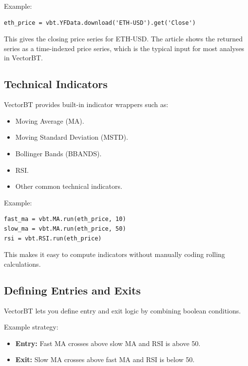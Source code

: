 \documentclass[12pt,openany]{book}
\begin{document}
Example:

\begin{Verbatim}[breaklines=true,breakanywhere=true,fontsize=\small]
eth_price = vbt.YFData.download('ETH-USD').get('Close')
\end{Verbatim}

This gives the closing price series for ETH-USD. The article shows the returned series as a time-indexed price series, which is the typical input for most analyses in VectorBT.

\subsection{Technical Indicators}

VectorBT provides built-in indicator wrappers such as:

\begin{itemize}[leftmargin=*]
    \item Moving Average (MA).
    \item Moving Standard Deviation (MSTD).
    \item Bollinger Bands (BBANDS).
    \item RSI.
    \item Other common technical indicators.
\end{itemize}

Example:

\begin{Verbatim}[breaklines=true,breakanywhere=true,fontsize=\small]
fast_ma = vbt.MA.run(eth_price, 10)
slow_ma = vbt.MA.run(eth_price, 50)
rsi = vbt.RSI.run(eth_price)
\end{Verbatim}

This makes it easy to compute indicators without manually coding rolling calculations.

\subsection{Defining Entries and Exits}

VectorBT lets you define entry and exit logic by combining boolean conditions.

Example strategy:

\begin{itemize}[leftmargin=*]
    \item \textbf{Entry:} Fast MA crosses above slow MA and RSI is above 50.
    \item \textbf{Exit:} Slow MA crosses above fast MA and RSI is below 50.
\end{itemize}
\end{document}
